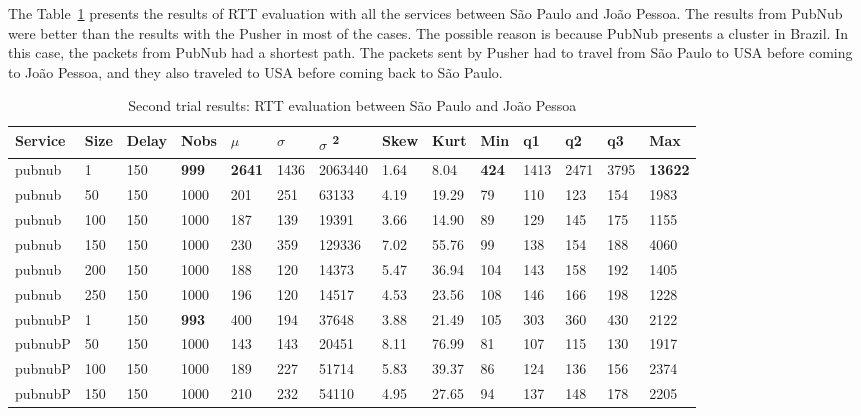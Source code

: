 The Table~\ref{tab:secondtrialsaojpa} presents the results of RTT evaluation with all the services between São Paulo and João Pessoa.
The results from PubNub were better than the results with the Pusher in most of the cases.
The possible reason is because PubNub presents a cluster in Brazil.
In this case, the packets from PubNub had a shortest path.
The packets sent by Pusher had to travel from São Paulo to USA before coming to João Pessoa, and they also traveled to USA before coming back to São Paulo.

\begin{table}[!htb]
	\small
	\centering
	\caption{Second trial results: RTT evaluation between São Paulo and João Pessoa}
	\label{tab:secondtrialsaojpa}
	\begin{tabular}{llllllllllllll}
		Service    & Size & Delay & Nobs & $\mu$ & $\sigma$  & $\sigma$ \textsuperscript{2} & Skew & Kurt & Min & q1   & q2   & q3   & Max   \\ \midrule
		pubnub     & 1            & 150   & \textbf{999}  & \textbf{2641} & 1436 & 2063440  & 1.64     & 8.04     & \textbf{424} & 1413 & 2471 & 3795 & \textbf{13622} \\
		pubnub     & 50           & 150   & 1000 & 201  & 251  & 63133    & 4.19     & 19.29    & 79  & 110  & 123  & 154  & 1983  \\
		pubnub     & 100          & 150   & 1000 & 187  & 139  & 19391    & 3.66     & 14.90    & 89  & 129  & 145  & 175  & 1155  \\
		pubnub     & 150          & 150   & 1000 & 230  & 359  & 129336   & 7.02     & 55.76    & 99  & 138  & 154  & 188  & 4060  \\
		pubnub     & 200          & 150   & 1000 & 188  & 120  & 14373    & 5.47     & 36.94    & 104 & 143  & 158  & 192  & 1405  \\
		pubnub     & 250          & 150   & 1000 & 196  & 120  & 14517    & 4.53     & 23.56    & 108 & 146  & 166  & 198  & 1228  \\ \hline
		pubnubP & 1            & 150   & \textbf{993}  & 400  & 194  & 37648    & 3.88     & 21.49    & 105 & 303  & 360  & 430  & 2122  \\
		pubnubP & 50           & 150   & 1000 & 143  & 143  & 20451    & 8.11     & 76.99    & 81  & 107  & 115  & 130  & 1917  \\
		pubnubP & 100          & 150   & 1000 & 189  & 227  & 51714    & 5.83     & 39.37    & 86  & 124  & 136  & 156  & 2374  \\
		pubnubP & 150          & 150   & 1000 & 210  & 232  & 54110    & 4.95     & 27.65    & 94  & 137  & 148  & 178  & 2205  \\

\end{tabular}
\end{table}
